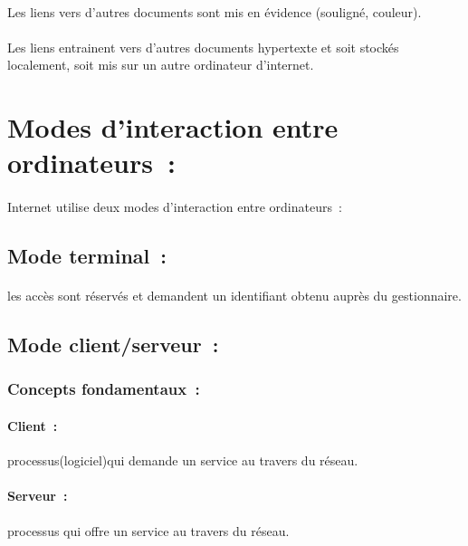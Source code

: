 \paragraph{}
Les liens vers d’autres documents sont mis en évidence (souligné, couleur).
\paragraph{}
Les liens entrainent vers d’autres documents hypertexte et soit stockés localement, soit mis sur un autre ordinateur d’internet.
\section{Modes d’interaction entre ordinateurs :}
\paragraph{}
Internet utilise deux modes d’interaction entre ordinateurs :
\subsection{Mode terminal : }
\paragraph{}
les accès sont réservés et demandent un identifiant obtenu auprès du gestionnaire.
\subsection{Mode client/serveur :}
\subsubsection{Concepts fondamentaux :}
\paragraph{Client : }
processus(logiciel)qui demande un service au travers du réseau.
\paragraph{Serveur : }
processus qui offre un service au travers du réseau.

